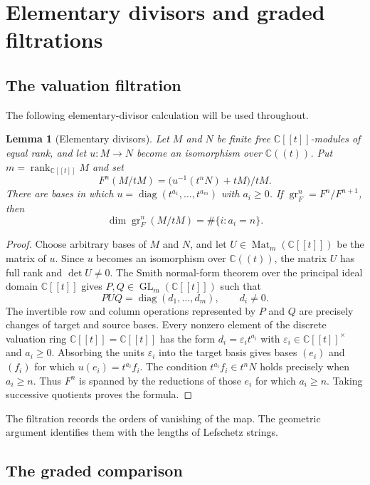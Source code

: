 \documentclass[10pt,a4paper]{amsart}
\newtheorem{lemma}[theorem]{Lemma}
\newcommand{\C}{\mathbb C}
\newcommand{\A}{\C[[t]]}
\newcommand{\K}{\C((t))}
\newcommand{\Gr}{\operatorname{gr}}
\begin{document}
\section{Elementary divisors and graded filtrations}

\subsection{The valuation filtration}

The following elementary-divisor calculation will be used throughout.

\begin{lemma}[Elementary divisors]\label{lem:ed}
Let $M$ and $N$ be finite free $\A$-modules of equal rank, and let
$u:M\to N$ become an isomorphism over $\K$.  Put
$m=\operatorname{rank}_{\A}M$ and set
\[
 F^n(M/tM)=\bigl(u^{-1}(t^nN)+tM\bigr)/tM.
\]
There are bases in which $u=\operatorname{diag}(t^{a_1},\ldots,t^{a_m})$
with $a_i\geq0$.  If
$\Gr_F^n=F^n/F^{n+1}$, then
\[
 \dim\Gr_F^n(M/tM)=\#\{i:a_i=n\}.
\]
\end{lemma}

\begin{proof}
Choose arbitrary bases of $M$ and $N$, and let $U\in\operatorname{Mat}_m(\A)$
be the matrix of $u$.  Since $u$ becomes an isomorphism over $\K$, the matrix
$U$ has full rank and $\det U\ne0$.  The Smith normal-form theorem over the
principal ideal domain $\A$ gives $P,Q\in\operatorname{GL}_m(\A)$ such that
\[
 PUQ=\operatorname{diag}(d_1,\ldots,d_m),
 \qquad d_i\ne0.
\]
The invertible row and column operations represented by $P$ and $Q$ are
precisely changes of target and source bases.  Every nonzero element of the discrete valuation ring
$\A=\mathbb C[[t]]$ has the form $d_i=\varepsilon_i t^{a_i}$ with
$\varepsilon_i\in\A^\times$ and $a_i\geq0$.  Absorbing the units
$\varepsilon_i$ into the target basis gives bases $(e_i)$ and $(f_i)$ for
which $u(e_i)=t^{a_i}f_i$.  The condition
$t^{a_i}f_i\in t^nN$ holds precisely when
$a_i\geq n$.  Thus $F^n$ is spanned by the reductions of those $e_i$ for
which $a_i\geq n$.  Taking successive quotients proves the formula.
\end{proof}

The filtration records the orders of vanishing of the map.  The geometric
argument identifies them with the lengths of Lefschetz strings.

\subsection{The graded comparison}
\end{document}
